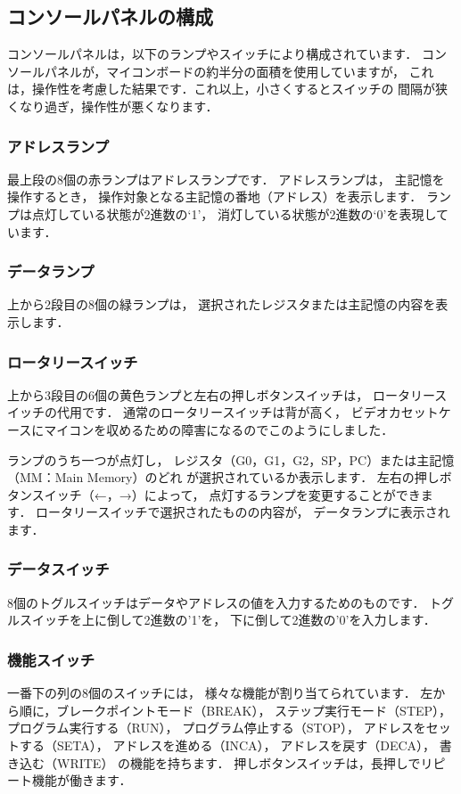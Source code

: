 \subsection{コンソールパネルの構成}
コンソールパネルは，以下のランプやスイッチにより構成されています．
コンソールパネルが，マイコンボードの約半分の面積を使用していますが，
これは，操作性を考慮した結果です．これ以上，小さくするとスイッチの
間隔が狭くなり過ぎ，操作性が悪くなります．

\subsubsection{アドレスランプ}
最上段の8個の赤ランプはアドレスランプです．
アドレスランプは，
主記憶を操作するとき，
操作対象となる主記憶の番地（アドレス）を表示します．
ランプは点灯している状態が2進数の`1'，
消灯している状態が2進数の`0'を表現しています．

\subsubsection{データランプ}
上から2段目の8個の緑ランプは，
選択されたレジスタまたは主記憶の内容を表示します．

\subsubsection{ロータリースイッチ}
上から3段目の6個の黄色ランプと左右の押しボタンスイッチは，
ロータリースイッチの代用です．
通常のロータリースイッチは背が高く，
ビデオカセットケースにマイコンを収めるための障害になるのでこのようにしました．

ランプのうち一つが点灯し，
レジスタ（G0，G1，G2，SP，PC）または主記憶（MM：Main Memory）のどれ
が選択されているか表示します．
左右の押しボタンスイッチ（←，→）によって，
点灯するランプを変更することができます．
ロータリースイッチで選択されたものの内容が，
データランプに表示されます．

\subsubsection{データスイッチ}
8個のトグルスイッチはデータやアドレスの値を入力するためのものです．
トグルスイッチを上に倒して2進数の'1'を，
下に倒して2進数の'0'を入力します．

\subsubsection{機能スイッチ}
一番下の列の8個のスイッチには，
様々な機能が割り当てられています．
左から順に，ブレークポイントモード（BREAK），
ステップ実行モード（STEP），
プログラム実行する（RUN），
プログラム停止する（STOP），
アドレスをセットする（SETA），
アドレスを進める（INCA），
アドレスを戻す（DECA），
書き込む（WRITE）
の機能を持ちます．
押しボタンスイッチは，長押しでリピート機能が働きます．

